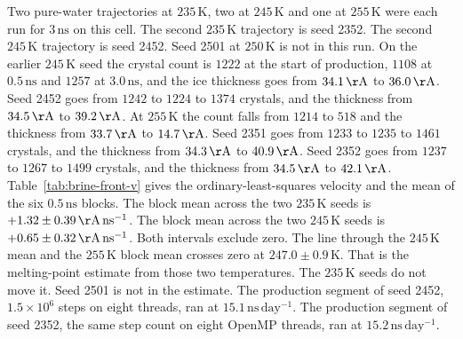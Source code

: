 Two pure-water trajectories at $235\,\mathrm{K}$, two at
$245\,\mathrm{K}$ and one at $255\,\mathrm{K}$ were each run for
$3\,\mathrm{ns}$ on this cell.
The second $235\,\mathrm{K}$ trajectory is seed 2352.
The second $245\,\mathrm{K}$ trajectory is seed 2452.
Seed 2501 at $250\,\mathrm{K}$ is not in this run.
On the earlier $245\,\mathrm{K}$ seed the crystal count is $1222$
at the start of production, $1108$ at $0.5\,\mathrm{ns}$ and $1257$
at $3.0\,\mathrm{ns}$, and the ice thickness goes from
$34.1\,\mathrm{\AA}$ to $36.0\,\mathrm{\AA}$.
Seed 2452 goes from $1242$ to $1224$ to $1374$ crystals, and the
thickness from $34.5\,\mathrm{\AA}$ to $39.2\,\mathrm{\AA}$.
At $255\,\mathrm{K}$ the count falls from $1214$ to $518$ and the
thickness from $33.7\,\mathrm{\AA}$ to $14.7\,\mathrm{\AA}$.
Seed 2351 goes from $1233$ to $1235$ to $1461$ crystals, and the
thickness from $34.3\,\mathrm{\AA}$ to $40.9\,\mathrm{\AA}$.
Seed 2352 goes from $1237$ to $1267$ to $1499$ crystals, and the
thickness from $34.5\,\mathrm{\AA}$ to $42.1\,\mathrm{\AA}$.
Table~\ref{tab:brine-front-v} gives the ordinary-least-squares
velocity and the mean of the six $0.5\,\mathrm{ns}$ blocks.
The block mean across the two $235\,\mathrm{K}$ seeds is
$+1.32\pm 0.39\,\mathrm{\AA\,ns^{-1}}$.
The block mean across the two $245\,\mathrm{K}$ seeds is
$+0.65\pm 0.32\,\mathrm{\AA\,ns^{-1}}$.
Both intervals exclude zero.
The line through the $245\,\mathrm{K}$ mean and the
$255\,\mathrm{K}$ block mean crosses zero at
$247.0\pm 0.9\,\mathrm{K}$.
That is the melting-point estimate from those two temperatures.
The $235\,\mathrm{K}$ seeds do not move it.
Seed 2501 is not in the estimate.
The production segment of seed 2452, $1.5\times 10^{6}$ steps on
eight threads, ran at $15.1\,\mathrm{ns\,day^{-1}}$.
The production segment of seed 2352, the same step count on
eight OpenMP threads, ran at $15.2\,\mathrm{ns\,day^{-1}}$.

